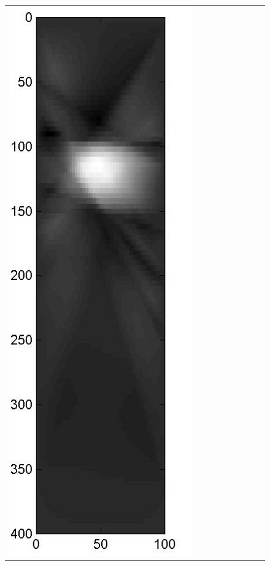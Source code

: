\documentclass[11pt]{article}
\begin{document}
\begin{figure}[!h]
\begin{center}
\begin{tabular}{|c|c|c|c|c|c|c|c|c|}
			\includegraphics[width=.9\iwidth]{figures/newFigs/noisy/resultsExp-2-mk}
			&

\end{tabular}
\end{center}
\end{figure}
\end{document}
